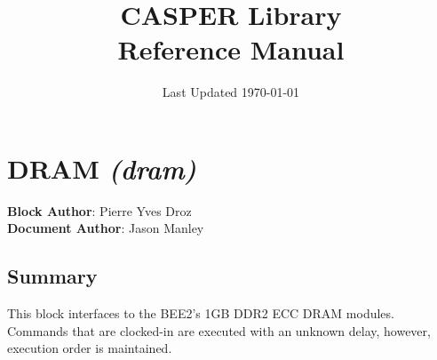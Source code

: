 \documentclass{article}
\title{\textbf{CASPER Library} \\Reference Manual}
\date{Last Updated \today}
\newcommand{\Block}[6]{\section {#1 \emph{(#2)}} \label{#3} \textbf{Block Author}: #4 \\ \textbf{Document Author}: #5 \subsection*{Summary}#6}
\begin{document}
\maketitle


%






\Block{DRAM}{dram}{dram}{Pierre Yves Droz}{Jason Manley}{This block interfaces to the BEE2's 1GB DDR2 ECC DRAM modules. Commands that are clocked-in are executed with an unknown delay, however, execution order is maintained.}
\end{document}
